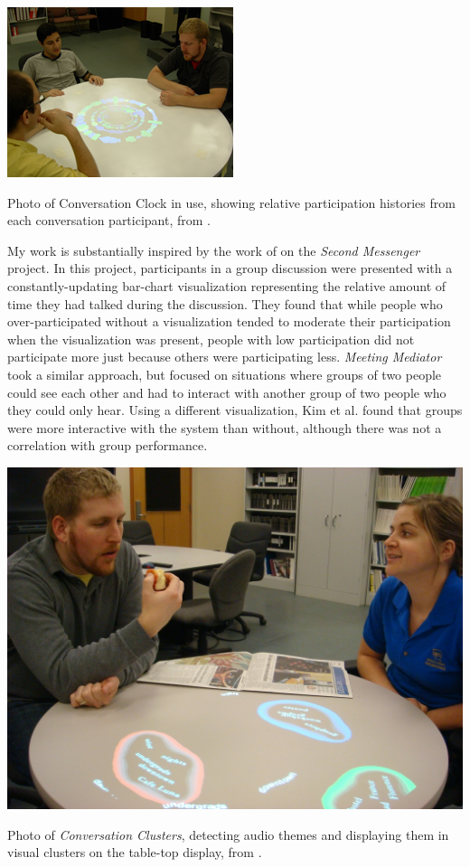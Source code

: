 \begin{marginfigure}
	\includegraphics{figures/conversation_clock.png}
	\caption{Photo of Conversation Clock in use, showing relative participation histories from each conversation participant, from \citep{Bergstrom:2007je}.}
	\label{fig:conversation-clock}
\end{marginfigure}

My work is substantially inspired by the work of \citet{DiMicco:2007ie} on the \emph{Second Messenger} project. In this project, participants in a group discussion were presented with a constantly-updating bar-chart visualization representing the relative amount of time they had talked during the discussion. They found that while people who over-participated without a visualization tended to moderate their participation when the visualization was present, people with low participation did not participate more just because others were participating less. \emph{Meeting Mediator} \citep{Kim:2008ip} took a similar approach, but focused on situations where groups of two people could see each other and had to interact with another group of two people who they could only hear. Using a different visualization, Kim et al. found that groups were more interactive with the system than without, although there was not a correlation with group performance. 

\begin{marginfigure}
	\includegraphics{figures/conversation_clusters.jpg}
	\caption{Photo of \emph{Conversation Clusters}, detecting audio themes and displaying them in visual clusters on the table-top display, from  \citep{Bergstrom:2009fe}.}
	\label{fig:conversation-clusters}
\end{marginfigure}


